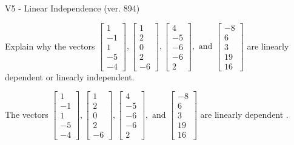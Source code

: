 \begin{exercise}
  \begin{exerciseTitle}V5 - Linear Independence (ver. 894)\end{exerciseTitle}
  \begin{exerciseStatement}
    Explain why the vectors \(\left[\begin{array}{r}
1 \\
-1 \\
1 \\
-5 \\
-4
\end{array}\right] , \left[\begin{array}{r}
1 \\
2 \\
0 \\
2 \\
-6
\end{array}\right] , \left[\begin{array}{r}
4 \\
-5 \\
-6 \\
-6 \\
2
\end{array}\right] , \text{ and } \left[\begin{array}{r}
-8 \\
6 \\
3 \\
19 \\
16
\end{array}\right]\) are linearly dependent or linearly independent.	


  \end{exerciseStatement}
  \begin{exerciseAnswer}
   The vectors \(\left[\begin{array}{r}
1 \\
-1 \\
1 \\
-5 \\
-4
\end{array}\right] , \left[\begin{array}{r}
1 \\
2 \\
0 \\
2 \\
-6
\end{array}\right] , \left[\begin{array}{r}
4 \\
-5 \\
-6 \\
-6 \\
2
\end{array}\right] , \text{ and } \left[\begin{array}{r}
-8 \\
6 \\
3 \\
19 \\
16
\end{array}\right]\) are 
  	 linearly dependent  .
  


  \end{exerciseAnswer}
\end{exercise}